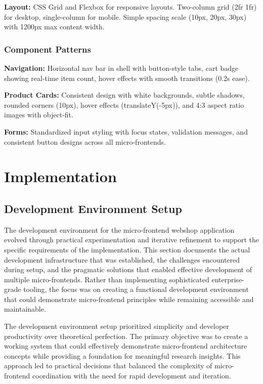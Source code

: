 \documentclass[12pt,a4paper]{report}
\begin{document}
\textbf{Layout:} CSS Grid and Flexbox for responsive layouts. Two-column grid (2fr 1fr) for desktop, single-column for mobile. Simple spacing scale (10px, 20px, 30px) with 1200px max content width.

\subsection{Component Patterns}

\textbf{Navigation:} Horizontal nav bar in shell with button-style tabs, cart badge showing real-time item count, hover effects with smooth transitions (0.2s ease).

\textbf{Product Cards:} Consistent design with white backgrounds, subtle shadows, rounded corners (10px), hover effects (translateY(-5px)), and 4:3 aspect ratio images with object-fit.

\textbf{Forms:} Standardized input styling with focus states, validation messages, and consistent button designs across all micro-frontends.

\chapter{Implementation}
\section{Development Environment Setup}

The development environment for the micro-frontend webshop application evolved through practical experimentation and iterative refinement to support the specific requirements of the implementation. This section documents the actual development infrastructure that was established, the challenges encountered during setup, and the pragmatic solutions that enabled effective development of multiple micro-frontends. Rather than implementing sophisticated enterprise-grade tooling, the focus was on creating a functional development environment that could demonstrate micro-frontend principles while remaining accessible and maintainable.

The development environment setup prioritized simplicity and developer productivity over theoretical perfection. The primary objective was to create a working system that could effectively demonstrate micro-frontend architecture concepts while providing a foundation for meaningful research insights. This approach led to practical decisions that balanced the complexity of micro-frontend coordination with the need for rapid development and iteration.
\end{document}
